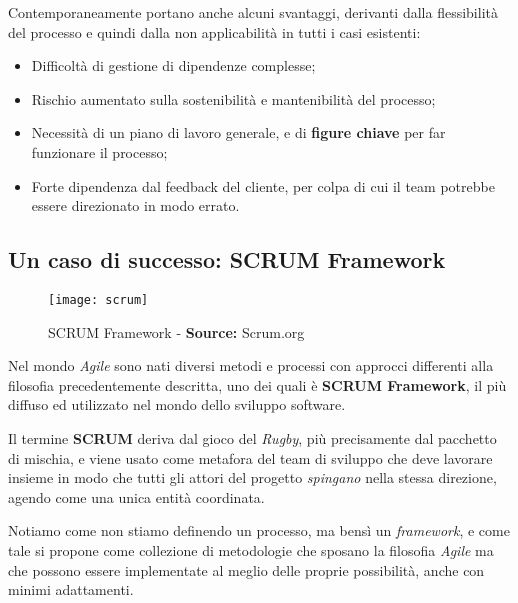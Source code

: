\documentclass[../main.tex]{subfiles}
\begin{document}
        		Contemporaneamente portano anche alcuni svantaggi, derivanti dalla flessibilità del processo e quindi dalla non applicabilità in tutti i casi esistenti:
        		\begin{itemize}
        			\item Difficoltà di gestione di dipendenze complesse;
        			\item Rischio aumentato sulla sostenibilità e mantenibilità del processo;
        			\item Necessità di un piano di lavoro generale, e di \textbf{figure chiave} per far funzionare il processo;
        			\item Forte dipendenza dal feedback del cliente, per colpa di cui il team potrebbe essere direzionato in modo errato.
        		\end{itemize}
        
        	\subsection{Un caso di successo: SCRUM Framework}
        	
        		\begin{figure}[h]
        			\centering
        			\texttt{[image: scrum]}
        			\caption{SCRUM Framework - \textbf{Source:} Scrum.org}
        			\label{fig:scrum}
        		\end{figure}
        	
        		Nel mondo \emph{Agile} sono nati diversi metodi e processi con approcci differenti alla filosofia precedentemente descritta, uno dei quali è \textbf{SCRUM Framework}\cite{scrum}, il più diffuso ed utilizzato nel mondo dello sviluppo software.
        		
        		Il termine \textbf{SCRUM} deriva dal gioco del \emph{Rugby}, più precisamente dal pacchetto di mischia, e viene usato come metafora del team di sviluppo che deve lavorare insieme in modo che tutti gli attori del progetto \emph{spingano} nella stessa direzione, agendo come una unica entità coordinata.
        		
        		Notiamo come non stiamo definendo un processo, ma bensì un \emph{framework}, e come tale si propone come
        		collezione di metodologie che sposano la filosofia \emph{Agile} ma che possono essere implementate al meglio delle proprie possibilità, anche con minimi adattamenti.
        		
\end{document}
